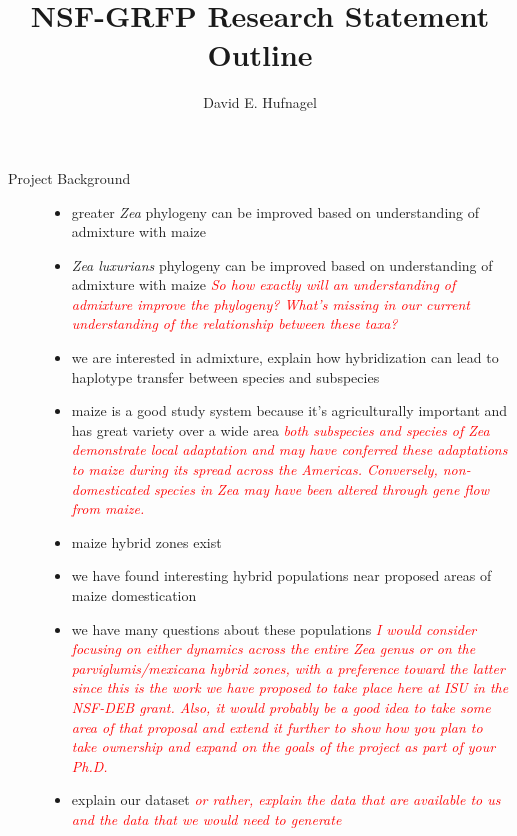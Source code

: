 \documentclass[11pt]{amsart}
\title{NSF-GRFP Research Statement Outline}
\author{David E. Hufnagel}
\newcommand{\mbh}[1]{\textcolor{red}{ \emph{\scriptsize  #1}} }
\begin{document}
\maketitle

\begin{description}
	\item[Project Background] \hfill
		\begin{itemize}
			\item greater \emph{Zea} phylogeny can be improved based on understanding of admixture with maize
			\item \emph{Zea luxurians} phylogeny  can be improved based on understanding of admixture with maize \mbh{So how exactly will an understanding of admixture improve the phylogeny? What's missing in our current understanding of the relationship between these taxa?}
			\item we are interested in admixture, explain how hybridization can lead to haplotype transfer between species and subspecies
			\item maize is a good study system because it's agriculturally important and has great variety over a wide area \mbh{both subspecies and species of \emph{Zea} demonstrate local adaptation and may have conferred these adaptations to maize during its spread across the Americas.  Conversely, non-domesticated species in \emph{Zea} may have been altered through gene flow from maize.}
			\item maize hybrid zones exist
			\item we have found interesting hybrid populations near proposed areas of maize domestication
			\item we have many questions about these populations
			\mbh{I would consider focusing on either dynamics across the entire \emph{Zea} genus or on the \emph{parviglumis}/\emph{mexicana} hybrid zones, with a preference toward the latter since this is the work we have proposed to take place here at ISU in the NSF-DEB grant.  Also, it would probably be a good idea to take some area of that proposal and extend it further to show how you plan to take ownership and expand on the goals of the project as part of your Ph.D.}
			\item explain our dataset \mbh{or rather, explain the data that are available to us and the data that we would need to generate}

\end{itemize}
\end{description}
\end{document}
